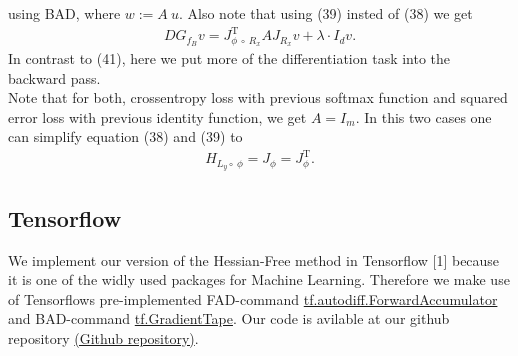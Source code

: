\documentclass[conference]{IEEEtran}
\begin{document}
using BAD, where $w := A\:u$. Also note that using (39) insted of (38) we get 
\begin{align}
DG_{f_{B}}v  = J_{\phi\:\circ\:R _{x}}^{\mathrm{T}}AJ_{R _{x}}v + \lambda\cdot I_{d}v.
\end{align}
In contrast to (41), here we put more of the differentiation task into the backward pass.\\ 
Note that for both, crossentropy loss with previous softmax function and squared error loss with previous identity function, we get $A = I_{m}$. In this two cases one can simplify equation (38) and (39) to 
\begin{align}
H_{L_{y}\circ\:\phi} = J_{\phi} = J_{\phi}^{\mathrm{T}}.
\end{align}




\subsection{Tensorflow}
\noindent
We implement our version of the Hessian-Free method in Tensorflow [1] because it is one of the widly used packages for Machine Learning.
Therefore we make use of Tensorflows pre-implemented FAD-command \href{https://www.tensorflow.org/api_docs/python/tf/autodiff/ForwardAccumulator}{tf.autodiff.ForwardAccumulator} and BAD-command \href{https://www.tensorflow.org/api_docs/python/tf/GradientTape}{tf.GradientTape}. Our code is avilable at our github repository \href{https://github.com/NiklasBrunn/Hessian_Free_Optimization_of_Deep_Neural_Networks}{(Github repository)}.
\end{document}
